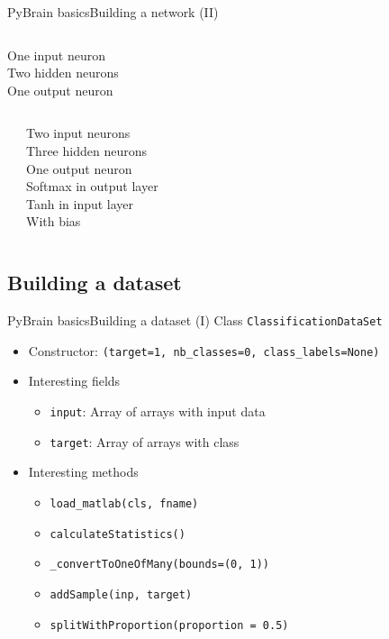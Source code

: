 \documentclass[10pt,compress]{beamer} %
\begin{document}
\begin{frame}{PyBrain basics}{Building a network (II)}
\small{
    \begin{columns}
	   One input neuron\\
	   Two hidden neurons\\
	   One output neuron
    	\begin{block}{}
       \vspace{-0.2cm}
       
       \vspace{-0.2cm}
    	\end{block}
	\end{columns}

    \begin{columns}
    	\begin{block}{}
       \vspace{-0.2cm}
       
       \vspace{-0.2cm}
    	\end{block}
	   Two input neurons\\
	   Three hidden neurons\\
	   One output neuron\\
	   Softmax in output layer\\
	   Tanh in input layer\\
	   With bias
	\end{columns}
}
\end{frame}

\subsection{Building a dataset}
\begin{frame}{PyBrain basics}{Building a dataset (I)}
Class \texttt{ClassificationDataSet}
\begin{itemize}
	\item Constructor: \texttt{(target=1, nb\_classes=0, class\_labels=None)}
	\item Interesting fields
	\begin{itemize}
	\item \texttt{input}: Array of arrays with input data
	\item \texttt{target}: Array of arrays with class
	\end{itemize}
	\item Interesting methods
	\begin{itemize}
	\item \texttt{load\_matlab(cls, fname)}
	\item \texttt{calculateStatistics()}
	\item \texttt{\_convertToOneOfMany(bounds=(0, 1))}
	\item \texttt{addSample(inp, target)}
	\item \texttt{splitWithProportion(proportion = 0.5)}
	\end{itemize}
\end{itemize}
\end{frame}
\end{document}
